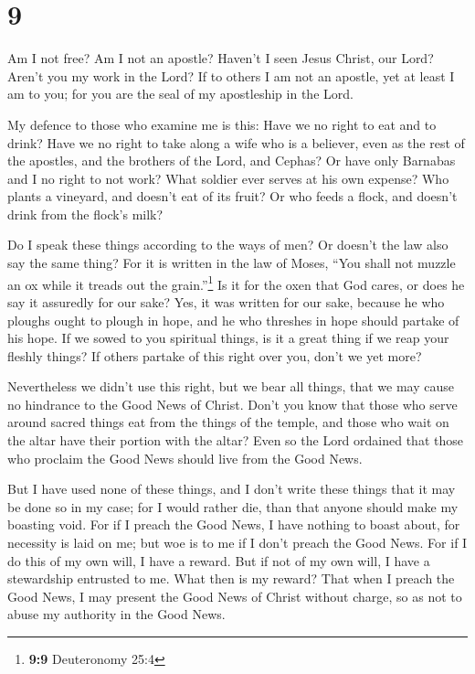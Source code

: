 \hypertarget{section-8}{%
\section{9}\label{section-8}}

 Am I not free? Am I not an apostle? Haven't I seen Jesus
Christ, our Lord? Aren't you my work in the Lord?  If to
others I am not an apostle, yet at least I am to you; for you are the
seal of my apostleship in the Lord.

 My defence to those who examine me is this:
 Have we no right to eat and to drink?  Have
we no right to take along a wife who is a believer, even as the rest of
the apostles, and the brothers of the Lord, and Cephas? 
Or have only Barnabas and I no right to not work?  What
soldier ever serves at his own expense? Who plants a vineyard, and
doesn't eat of its fruit? Or who feeds a flock, and doesn't drink from
the flock's milk?

 Do I speak these things according to the ways of men? Or
doesn't the law also say the same thing?  For it is
written in the law of Moses, ``You shall not muzzle an ox while it
treads out the grain.''\footnote{\textbf{9:9} Deuteronomy 25:4} Is it
for the oxen that God cares,  or does he say it assuredly
for our sake? Yes, it was written for our sake, because he who ploughs
ought to plough in hope, and he who threshes in hope should partake of
his hope.  If we sowed to you spiritual things, is it a
great thing if we reap your fleshly things?  If others
partake of this right over you, don't we yet more?

Nevertheless we didn't use this right, but we bear all things, that we
may cause no hindrance to the Good News of Christ.  Don't
you know that those who serve around sacred things eat from the things
of the temple, and those who wait on the altar have their portion with
the altar?  Even so the Lord ordained that those who
proclaim the Good News should live from the Good News.

 But I have used none of these things, and I don't write
these things that it may be done so in my case; for I would rather die,
than that anyone should make my boasting void.  For if I
preach the Good News, I have nothing to boast about, for necessity is
laid on me; but woe is to me if I don't preach the Good News.
 For if I do this of my own will, I have a reward. But if
not of my own will, I have a stewardship entrusted to me.
 What then is my reward? That when I preach the Good
News, I may present the Good News of Christ without charge, so as not to
abuse my authority in the Good News.


